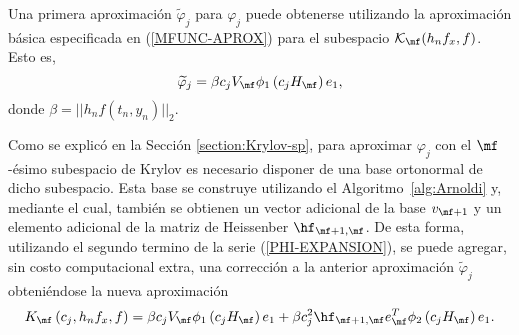 Una primera aproximación $\widetilde{\varphi}_j$ para $\varphi_j$ puede obtenerse utilizando la aproximaci\'on básica especificada en (\ref{MFUNC-APROX}) para el subespacio $\mathcal{K}_\mf(h_nf_x,f)$. Esto es, 
\begin{equation*}
\widetilde{\varphi}_j = \beta c_jV_{\mf}\phi_1\left( c_j H_{\mf} \right) e_1, %
\end{equation*}
 donde $\beta=\vert\vert h_nf(t_n,y_n) \vert\vert_2$.
 
 Como se explic\'o en la Secci\'on \ref{section:Krylov-sp}, para aproximar $\varphi_j$ con el  $\mf$-\'esimo subespacio de Krylov es necesario disponer de una base ortonormal de dicho subespacio. Esta base se construye utilizando el Algoritmo~\ref{alg:Arnoldi} y, mediante el cual, también se obtienen un vector adicional de la base $v_{\mf+1}$ y un elemento adicional de la matriz de Heissenber $\hf_{\mf+1,\mf}$. De esta forma, utilizando el segundo termino de la serie (\ref{PHI-EXPANSION}), se puede
 agregar, sin costo computacional extra, una correcci\'on a la anterior aproximaci\'on $\widetilde{\varphi}_j$ obteni\'endose la nueva aproximación
\begin{equation}\label{kaprox}
K_{\mf}\left(c_j,h_nf_x , f \right)=\beta c_jV_{\mf}\phi_1\left( c_j H_{\mf} \right) e_1 + \beta c_j^{2}\hf_{\mf+1,\mf}e_\mf^T\phi_2\left(c_j H_\mf\right) e_1.
\end{equation}


